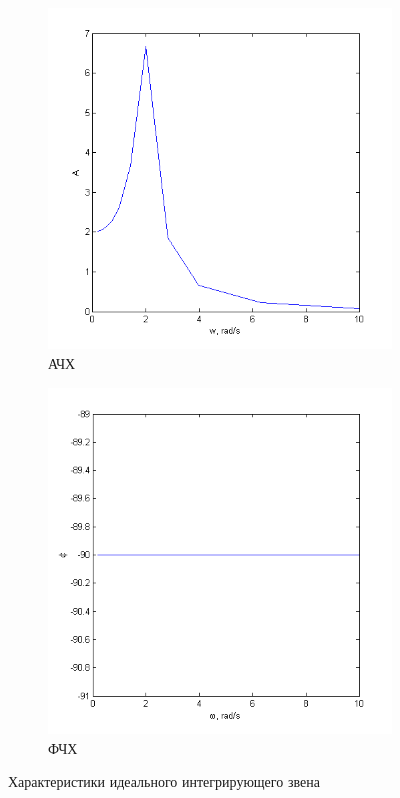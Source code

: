 \documentclass[a4paper, 11pt, russian]{article}
\begin{document}
\begin{figure}[ht!]
        \begin{subfigure}[h]{0.44\textwidth}
            \includegraphics[width = \textwidth]{integratingLinkAFR}
            \caption{АЧХ}
        \end{subfigure}
        \hfill
        \begin{subfigure}[h]{0.44\textwidth}
            \includegraphics[width = \textwidth]{integratingLinkPFR}
            \caption{ФЧХ}
        \end{subfigure}
        \caption{Характеристики идеального интегрирующего звена}
    \end{figure}
\end{document}
